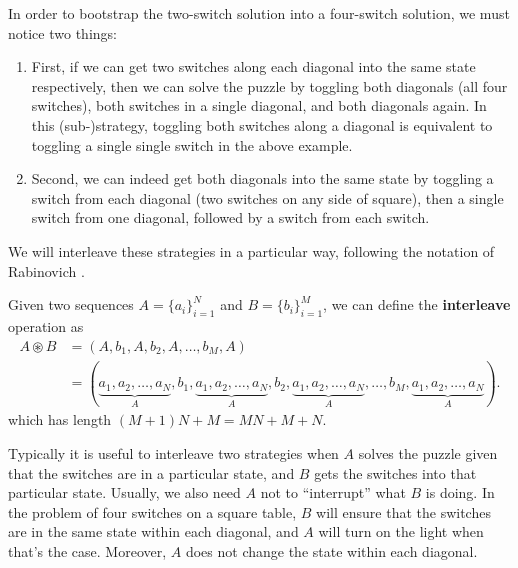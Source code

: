 In order to bootstrap the two-switch solution into a four-switch solution,
we must notice two things: \begin{enumerate}
  \item First, if we can get two switches along each diagonal into the same state
  respectively, then we can solve the puzzle by toggling both diagonals
  (all four switches), both switches in a single diagonal, and both diagonals
  again. In this (sub-)strategy, toggling both switches along a diagonal is
  equivalent to toggling a single single switch in the above example.
  \item Second, we can indeed get both diagonals into the same state by toggling a
  switch from each diagonal (two switches on any side of square),
  then a single switch from one diagonal,
  followed by a switch from each switch.
\end{enumerate}

We will interleave these strategies in a particular way, following the notation
of Rabinovich \cite{Rabinovich2022}.

\begin{definition}
  Given two sequences $A = \{a_i\}_{i=1}^N$ and $B = \{b_i\}_{i=1}^M$, we can
  define the \textbf{interleave} operation as \begin{align}
    A \circledast B &= (A,b_1,A,b_2,A,\dots,b_M,A) \\
      &= (
      \underbrace{a_1, a_2, \dots, a_N}_A,
      b_1,
      \underbrace{a_1, a_2, \dots, a_N}_A,
      b_2,
      \underbrace{a_1, a_2, \dots, a_N}_A,
      \dots,
      b_M,
      \underbrace{a_1, a_2, \dots, a_N}_A).
  \end{align} which has length $(M+1)N + M = MN + M + N$.
\end{definition}

Typically it is useful to interleave two strategies when
$A$ solves the puzzle given that the switches are in a particular state, and
$B$ gets the switches into that particular state.
Usually, we also need $A$ not to ``interrupt'' what $B$ is doing.
In the problem of four switches on a square table,
$B$ will ensure that the switches are in the same state within each diagonal,
and $A$ will turn on the light when that's the case.
Moreover, $A$ does not change the state within each diagonal.

